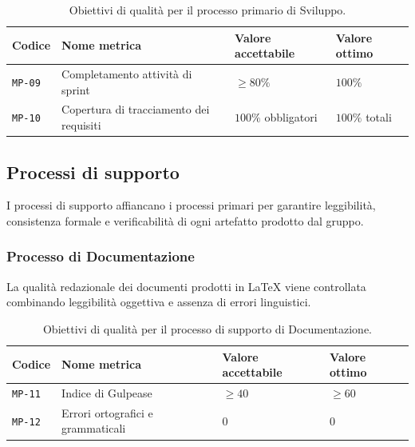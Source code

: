 \documentclass[11pt, a4paper]{article}
\newcommand{\req}[1]{\texttt{#1}}
\begin{document}
\begin{table}[htbp]
    \centering
    \renewcommand{\arraystretch}{1.3}
    \begin{tabularx}{\textwidth}{|P{1.8cm}|X|P{3.8cm}|P{3.4cm}|}
        \hline
        \textbf{\textcolor{primaryColor}{Codice}} & \textbf{\textcolor{primaryColor}{Nome metrica}} & \textbf{\textcolor{primaryColor}{Valore accettabile}} & \textbf{\textcolor{primaryColor}{Valore ottimo}} \\ \hline
        \req{MP-09} & Completamento attività di sprint & $\ge 80\%$ & $100\%$ \\ \hline
        \req{MP-10} & Copertura di tracciamento dei requisiti & $100\%$ obbligatori & $100\%$ totali \\ \hline
    \end{tabularx}
    \caption{Obiettivi di qualità per il processo primario di Sviluppo.}
    \label{tab:proc-sviluppo}
\end{table}

\subsection{Processi di supporto}
I processi di supporto affiancano i processi primari per garantire leggibilità, consistenza formale e verificabilità di ogni artefatto prodotto dal gruppo.

\subsubsection{Processo di Documentazione}
La qualità redazionale dei documenti prodotti in \LaTeX{} viene controllata combinando leggibilità oggettiva e assenza di errori linguistici.

\begin{table}[htbp]
    \centering
    \renewcommand{\arraystretch}{1.3}
    \begin{tabularx}{\textwidth}{|P{1.8cm}|X|P{3.8cm}|P{3.4cm}|}
        \hline
        \textbf{\textcolor{primaryColor}{Codice}} & \textbf{\textcolor{primaryColor}{Nome metrica}} & \textbf{\textcolor{primaryColor}{Valore accettabile}} & \textbf{\textcolor{primaryColor}{Valore ottimo}} \\ \hline
        \req{MP-11} & Indice di Gulpease & $\ge 40$ & $\ge 60$ \\ \hline
        \req{MP-12} & Errori ortografici e grammaticali & $0$ & $0$ \\ \hline
    \end{tabularx}
    \caption{Obiettivi di qualità per il processo di supporto di Documentazione.}
    \label{tab:proc-documentazione}
\end{table}
\end{document}
